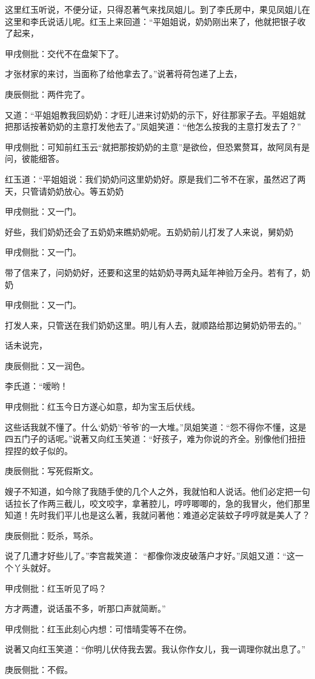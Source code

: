 \begin{parag}
    这里红玉听说，不便分证，只得忍著气来找凤姐儿。到了李氏房中，果见凤姐儿在这里和李氏说话儿呢。红玉上来回道：“平姐姐说，奶奶刚出来了，他就把银子收了起来，\begin{note}甲戌侧批：交代不在盘架下了。\end{note}才张材家的来讨，当面称了给他拿去了。”说著将荷包递了上去，\begin{note}庚辰侧批：两件完了。\end{note}又道：“平姐姐教我回奶奶：才旺儿进来讨奶奶的示下，好往那家子去。平姐姐就把那话按著奶奶的主意打发他去了。”凤姐笑道：“他怎么按我的主意打发去了？”\begin{note}甲戌侧批：可知前红玉云“就把那按奶奶的主意”是欲俭，但恐累赘耳，故阿凤有是问，彼能细答。\end{note}红玉道：“平姐姐说：我们奶奶问这里奶奶好。原是我们二爷不在家，虽然迟了两天，只管请奶奶放心。等五奶奶\begin{note}甲戌侧批：又一门。\end{note}好些，我们奶奶还会了五奶奶来瞧奶奶呢。五奶奶前儿打发了人来说，舅奶奶\begin{note}甲戌侧批：又一门。\end{note}带了信来了，问奶奶好，还要和这里的姑奶奶寻两丸延年神验万全丹。若有了，奶奶\begin{note}甲戌侧批：又一门。\end{note}打发人来，只管送在我们奶奶这里。明儿有人去，就顺路给那边舅奶奶带去的。”
\end{parag}


\begin{parag}
    话未说完，\begin{note}庚辰侧批：又一润色。\end{note}李氏道：“嗳哟！\begin{note}甲戌侧批：红玉今日方遂心如意，却为宝玉后伏线。\end{note}这些话我就不懂了。什么‘奶奶’‘爷爷’的一大堆。”凤姐笑道：“怨不得你不懂，这是四五门子的话呢。”说著又向红玉笑道：“好孩子，难为你说的齐全。别像他们扭扭捏捏的蚊子似的。\begin{note}庚辰侧批：写死假斯文。\end{note}嫂子不知道，如今除了我随手使的几个人之外，我就怕和人说话。他们必定把一句话拉长了作两三截儿，咬文咬字，拿著腔儿，哼哼唧唧的，急的我冒火，他们那里知道！先时我们平儿也是这么著，我就问著他：难道必定装蚊子哼哼就是美人了？\begin{note}庚辰侧批：贬杀，骂杀。\end{note}说了几遭才好些儿了。”李宫裁笑道： “都像你泼皮破落户才好。”凤姐又道：“这一个丫头就好。\begin{note}甲戌侧批：红玉听见了吗？\end{note}方才两遭，说话虽不多，听那口声就简断。”\begin{note}甲戌侧批：红玉此刻心内想：可惜晴雯等不在傍。\end{note}说著又向红玉笑道：“你明儿伏侍我去罢。我认你作女儿，我一调理你就出息了。”\begin{note}庚辰侧批：不假。\end{note}
\end{parag}


